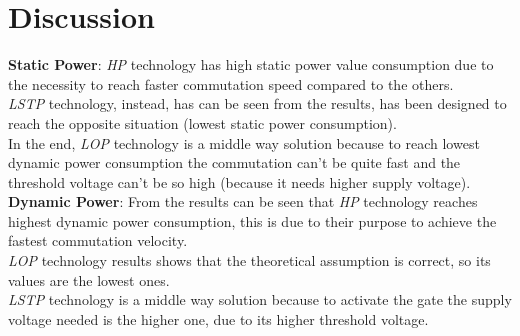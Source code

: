 \newpage
\section{Discussion}
\textbf{Static Power}:
\textit{HP} technology has high static power value consumption due to the necessity to reach faster commutation speed compared to the others.\\
\textit{LSTP} technology, instead, has can be seen from the results, has been designed to reach the opposite situation (lowest static power consumption).\\
In the end, \textit{LOP} technology is a middle way solution because to reach lowest dynamic power consumption the commutation can't be quite fast and the threshold voltage can't be so high (because it needs higher supply voltage).\\


\textbf{Dynamic Power}:
From the results can be seen that \textit{HP} technology reaches highest dynamic power consumption, this is due to their purpose to achieve the fastest commutation velocity.\\
\textit{LOP} technology results shows that the theoretical assumption is correct, so its values are the lowest ones.\\
\textit{LSTP} technology is a middle way solution because to activate the gate the supply voltage needed is the higher one, due to its higher threshold voltage.\\

